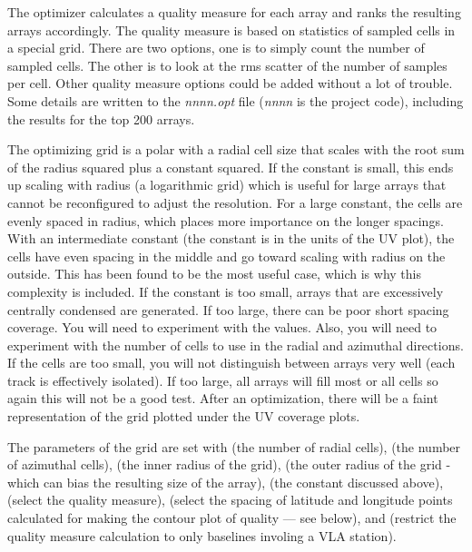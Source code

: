 \documentclass{report}
\begin{document}
The optimizer calculates a quality measure for each array and ranks
the resulting arrays accordingly.  The quality measure is based on
statistics of sampled cells in a special grid.  There are two options,
one is to simply count the number of sampled cells.  The other is to
look at the rms scatter of the number of samples per cell.  Other
quality measure options could be added without a lot of trouble.  Some
details are written to the {\sl nnnn.opt} file ({\sl nnnn} is the
project code), including the results for the top 200 arrays.

The optimizing grid is a polar with a radial cell size that scales
with the root sum of the radius squared plus a constant squared.  If
the constant is small, this ends up scaling with radius (a logarithmic
grid) which is useful for large arrays that cannot be reconfigured to
adjust the resolution.  For a large constant, the cells are evenly
spaced in radius, which places more importance on the longer spacings.
With an intermediate constant (the constant is in the units of the UV
plot), the cells have even spacing in the middle and go toward scaling
with radius on the outside.  This has been found to be the most useful
case, which is why this complexity is included.  If the constant is
too small, arrays that are excessively centrally condensed are
generated.  If too large, there can be poor short spacing coverage.
You will need to experiment with the values.  Also, you will need to
experiment with the number of cells to use in the radial and azimuthal
directions.  If the cells are too small, you will not distinguish
between arrays very well (each track is effectively isolated).  If too
large, all arrays will fill most or all cells so again this will not
be a good test.  After an optimization, there will be a faint
representation of the grid plotted under the UV coverage plots.

The parameters of the grid are set with  (the number of radial cells),  (the number of azimuthal cells),  (the inner radius of the grid),  (the outer radius of the grid - which can bias
the resulting size of the array), 
(the constant discussed above), 
(select the quality measure), 
(select the spacing of latitude and longitude points calculated for
making the contour plot of quality --- see below), and  (restrict the quality measure calculation to
only baselines involing a VLA station).
\end{document}
